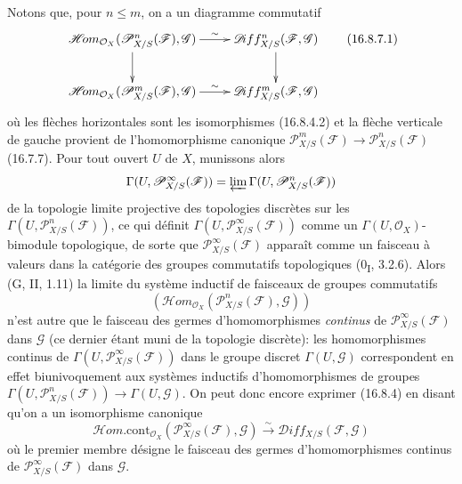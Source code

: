 \begin{env}[16.8.7]
Notons que, pour $n\leq m$, on a un diagramme commutatif
\[
  \xymatrix{
    \mathscr{H}\!om_{\mathcal{O}_X}
      (\mathscr{P}_{X/S}^n(\mathscr{F}),\mathscr{G})
      \ar[r]^-{\sim}\ar[d]
      &\mathscr{D}\!iff_{X/S}^n(\mathscr{F},\mathscr{G})\ar[d]\\
    \mathscr{H}\!om_{\mathcal{O}_X}
      (\mathscr{P}_{X/S}^m(\mathscr{F}),\mathscr{G})
      \ar[r]^-{\sim}
      &\mathscr{D}\!iff_{X/S}^m(\mathscr{F},\mathscr{G})
  }
  \tag{16.8.7.1}
  \label{IV.16.8.7.1}
\]
où les flèches horizontales sont les isomorphismes (16.8.4.2) et la flèche
verticale de gauche provient de l'homomorphisme canonique
$\mathscr{P}_{X/S}^m(\mathscr{F})\to
\mathscr{P}_{X/S}^n(\mathscr{F})$ (16.7.7). Pour tout ouvert $U$ de $X$,
munissons alors
\[
  \Gamma(U,\mathscr{P}_{X/S}^{\infty}(\mathscr{F}))
  =\varprojlim\Gamma(U,\mathscr{P}_{X/S}^n(\mathscr{F}))
\]
de la topologie limite projective des topologies discrètes sur les
$\Gamma(U,\mathscr{P}_{X/S}^n(\mathscr{F}))$, ce qui définit
$\Gamma(U,\mathscr{P}_{X/S}^{\infty}(\mathscr{F}))$ comme un
$\Gamma(U,\mathcal{O}_X)$-bimodule topologique, de sorte que
$\mathscr{P}_{X/S}^{\infty}(\mathscr{F})$ apparaît comme un faisceau à valeurs
dans la catégorie des groupes commutatifs topologiques
(0\textsubscript{I}, 3.2.6). Alors (G, II, 1.11) la limite du système inductif
de faisceaux de groupes commutatifs
\[
  (\mathscr{H}\!om_{\mathcal{O}_X}
  (\mathscr{P}_{X/S}^n(\mathscr{F}),\mathscr{G}))
\]
n'est autre que le faisceau des germes d'homomorphismes \emph{continus} de
$\mathscr{P}_{X/S}^{\infty}(\mathscr{F})$ dans $\mathscr{G}$ (ce dernier
étant muni de la topologie discrète): les homomorphismes continus de
$\Gamma(U,\mathscr{P}_{X/S}^{\infty}(\mathscr{F}))$ dans le groupe discret
$\Gamma(U,\mathscr{G})$ correspondent en effet biunivoquement aux systèmes
inductifs d'homomorphismes de groupes
$\Gamma(U,\mathscr{P}_{X/S}^n(\mathscr{F}))\to\Gamma(U,\mathscr{G})$. On peut
donc encore exprimer (16.8.4) en disant qu'on a un isomorphisme canonique
\[
  \mathscr{H}\!om.\mathrm{cont}_{\mathcal{O}_X}
  (\mathscr{P}_{X/S}^{\infty}(\mathscr{F}),\mathscr{G})
  \xrightarrow{\sim}
  \mathscr{D}\!iff_{X/S}(\mathscr{F},\mathscr{G})
\]
où le premier membre désigne le faisceau des germes d'homomorphismes continus
de $\mathscr{P}_{X/S}^{\infty}(\mathscr{F})$ dans $\mathscr{G}$.
\end{env}

